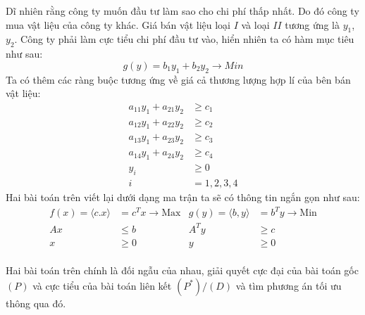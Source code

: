 \documentclass{article}
\begin{document}
            Dĩ nhiên rằng công ty muốn đầu tư làm sao cho chi phí thấp nhất. Do đó công ty mua vật liệu của công ty khác. Giá bán vật liệu loại $I$ và loại $II$ tương ứng là $y_1$, $y_2$. Công ty phải làm cực tiểu chi phí đầu tư vào, hiển
            nhiên ta có hàm mục tiêu như sau: \\
                \begin{equation}
                    g(y)=b_1y_1+b_2y_2 \rightarrow Min
                \end{equation}
            Ta có thêm các ràng buộc tương ứng về giá cả thương lượng hợp lí của bên bán vật liệu:
                \begin{equation}
                    \begin{split}
                        a_{11}y_1+a_{21}y_2 &\geq c_1 \\
                        a_{12}y_1+a_{22}y_2 &\geq c_2 \\
                        a_{13}y_1+a_{23}y_2 &\geq c_3 \\
                        a_{14}y_1+a_{24}y_2 &\geq c_4 \\
                        y_i &\geq 0 \\
                        i &= 1, 2, 3, 4
                    \end{split}
                \end{equation}
            Hai bài toán trên viết lại dưới dạng ma trận ta sẽ có thông tin ngắn gọn như sau:
                \begin{align*}
       f(x) =\langle c.x \rangle&= c^Tx \longrightarrow \text{Max}   & g(y) =\langle b,y \rangle&= b^Ty \longrightarrow \text{Min}\\
      Ax &\leq b & A^Ty &\geq c \\
     x &\geq 0 &  y &\geq 0
\end{align*}\\
            Hai bài toán trên chính là đối ngẫu của nhau, giải quyết cực đại của bài toán gốc $(P)$ và cực tiểu của bài toán liên kết $(P^*)/(D)$ và tìm phương án tối ưu thông qua đó.
\end{document}
